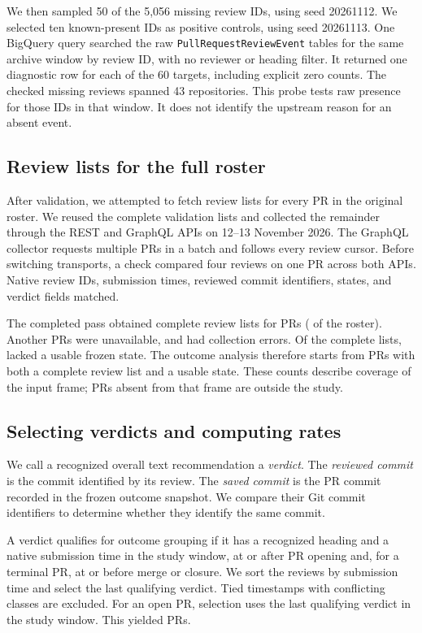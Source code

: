 \documentclass[11pt,letterpaper]{article}
\begin{document}
We then sampled 50 of the 5,056 missing review IDs, using seed 20261112.
We selected ten known-present IDs as positive controls, using seed
20261113. One BigQuery query searched the raw
\texttt{PullRequestReviewEvent} tables for the same archive window by
review ID, with no reviewer or heading filter. It returned one diagnostic
row for each of the 60 targets, including explicit zero counts.
The checked missing reviews spanned 43 repositories. This probe tests
raw presence for those IDs in that window. It does not identify the
upstream reason for an absent event.

\subsection{Review lists for the full roster}

After validation, we attempted to fetch review lists for every PR in the
original roster. We reused the \AuditAccessible{} complete validation lists and
collected the remainder through the REST and GraphQL APIs on
12--13 November 2026. The GraphQL collector requests multiple PRs in
a batch and follows every review cursor. Before switching transports,
a check compared four reviews on one PR across both APIs. Native review
IDs, submission times, reviewed commit identifiers, states, and verdict fields matched.

The completed pass obtained complete review lists for \CompleteLists{} PRs
(\CoverageRate{} of the roster). Another \UnavailableLists{} PRs were unavailable, and \ErrorLists{} had
collection errors. Of the complete lists, \MissingStateLists{} lacked a usable frozen
state. The outcome analysis therefore starts from \LinkedStateLists{} PRs with both
a complete review list and a usable state. These counts describe
coverage of the input frame; PRs absent from that frame are outside
the study.

\subsection{Selecting verdicts and computing rates}

We call a recognized overall text recommendation a \emph{verdict}.
The \emph{reviewed commit} is the commit identified by its review.
The \emph{saved commit} is the PR commit recorded in the frozen outcome
snapshot. We compare their Git commit identifiers to determine whether
they identify the same commit.

A verdict qualifies for outcome grouping if it has a recognized
heading and a native submission time in the study window, at or after
PR opening and, for a terminal PR, at or before merge or closure.
We sort the reviews by submission time and select the last qualifying
verdict. Tied timestamps with conflicting classes are excluded.
For an open PR, selection uses the last qualifying verdict in the
study window. This yielded \OutcomePRs{} PRs.
\end{document}
